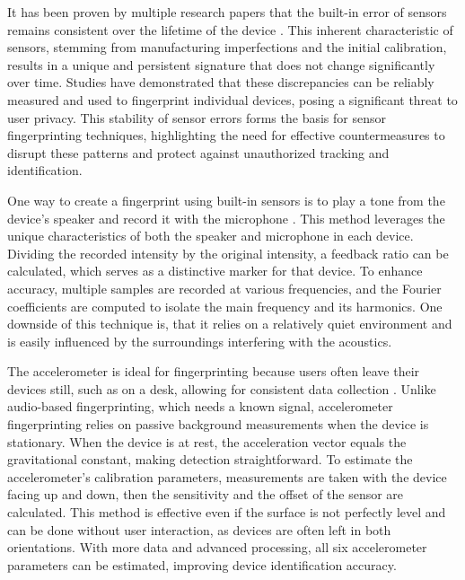 \documentclass[11pt,
  oneside,openany,    %
]{scrreprt}
\begin{document}
It has been proven by multiple research papers that the built-in error of sensors remains consistent over the lifetime of the device \cite{8835276, dey2014accelprint}. 
This inherent characteristic of sensors, stemming from manufacturing imperfections and the initial calibration, results in a unique and persistent signature that does not change significantly over time. 
Studies have demonstrated that these discrepancies can be reliably measured and used to fingerprint individual devices, posing a significant threat to user privacy. 
This stability of sensor errors forms the basis for sensor fingerprinting techniques, highlighting the need for effective countermeasures to disrupt these patterns and protect against unauthorized tracking and identification.

One way to create a fingerprint using built-in sensors is to play a tone from the device's speaker and record it with the microphone \cite{bojinov2014mobile, das2014poster, baldini2017survey}.
This method leverages the unique characteristics of both the speaker and microphone in each device.
Dividing the recorded intensity by the original intensity, a feedback ratio can be calculated, which serves as a distinctive marker for that device.
To enhance accuracy, multiple samples are recorded at various frequencies, and the Fourier coefficients are computed to isolate the main frequency and its harmonics.
One downside of this technique is, that it relies on a relatively quiet environment and is easily influenced by the surroundings interfering with the acoustics.

The accelerometer is ideal for fingerprinting because users often leave their devices still, such as on a desk, allowing for consistent data collection \cite{bojinov2014mobile, dey2014accelprint, 8835276, baldini2017survey}.
Unlike audio-based fingerprinting, which needs a known signal, accelerometer fingerprinting relies on passive background measurements when the device is stationary.
When the device is at rest, the acceleration vector equals the gravitational constant, making detection straightforward.
To estimate the accelerometer's calibration parameters, measurements are taken with the device facing up and down, then the sensitivity and the offset of the sensor are calculated.
This method is effective even if the surface is not perfectly level and can be done without user interaction, as devices are often left in both orientations.
With more data and advanced processing, all six accelerometer parameters can be estimated, improving device identification accuracy.
\end{document}
